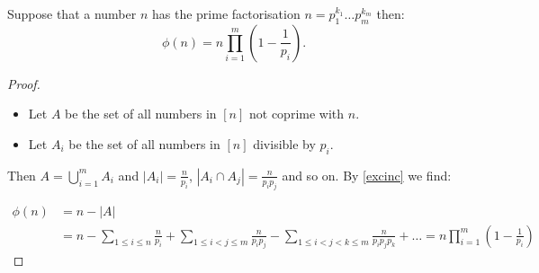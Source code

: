 \begin{proposition}
Suppose that a number $n$ has the prime factorisation $n=p^{k_{1}}_{1}\dots p_{m}^{k_{m}}$ then:
$$
\phi(n)=n\prod_{i=1}^{m} \left( 1-\frac{1}{p_{i}} \right).
$$
\end{proposition}
\begin{proof}
\begin{itemize}
\item Let $A$ be the set of all numbers in $[n]$ not coprime with $n$. 
\item Let $A_{i}$ be the set of all numbers in $[n]$ divisible by $p_{i}$.
\end{itemize}
Then $A=\bigcup _{i=1}^{m}A_{i}$ and $|A_{i}|=\frac{n}{p_{i}}$, $|A_{i}\cap A_{j}|=\frac{n}{p_{i}p_{j}}$ and so on. By \ref{excinc} we find:

\begin{align*}
\phi(n) & =n-|A| \\
 & =n-\sum _{1\le i \le n} \frac{n}{p_{i}}+\sum _{1\le i<j\le m} \frac{n}{p_{i}p_{j}}-\sum _{1\le i<j<k\le m} \frac{n}{p_{i}p_{j}p_{k}}+\dots=n\prod_{i=1}^{m} \left( 1-\frac{1}{p_{i}} \right)
\end{align*}

\end{proof}


